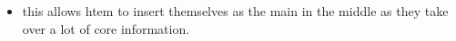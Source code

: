 \documentclass[]{article}
\providecommand{\tightlist}{%
  \setlength{\itemsep}{0pt}\setlength{\parskip}{0pt}}
\begin{document}
\begin{itemize}
\begin{itemize}
    \begin{itemize}
    \tightlist
    \item
      this allows htem to insert themselves as the main in the middle as
      they take over a lot of core information.
    \end{itemize}
  \end{itemize}
\end{itemize}
\end{document}
